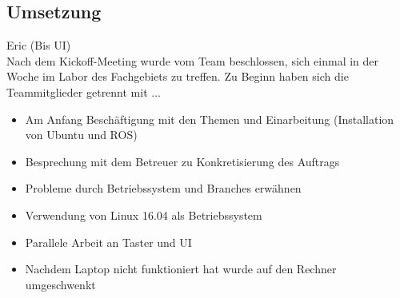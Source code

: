 \documentclass[a4paper,12pt,headsepline]{scrartcl}
\begin{document}
	\subsection{Umsetzung}
		Eric (Bis UI)\\
		Nach dem Kickoff-Meeting wurde vom Team beschlossen, sich einmal in der Woche im Labor des Fachgebiets zu treffen. Zu Beginn haben sich die Teammitglieder getrennt mit ... 
		\begin{itemize}
			\item Am Anfang Beschäftigung mit den Themen und Einarbeitung (Installation von Ubuntu und ROS)
			\item Besprechung mit dem Betreuer zu Konkretisierung des Auftrags

			\item Probleme durch Betriebssystem und Branches erwähnen
			\item Verwendung von Linux 16.04 als Betriebssystem
			\item Parallele Arbeit an Taster und UI
			\item Nachdem Laptop nicht funktioniert hat wurde auf den Rechner umgeschwenkt
		\end{itemize}
\end{document}
